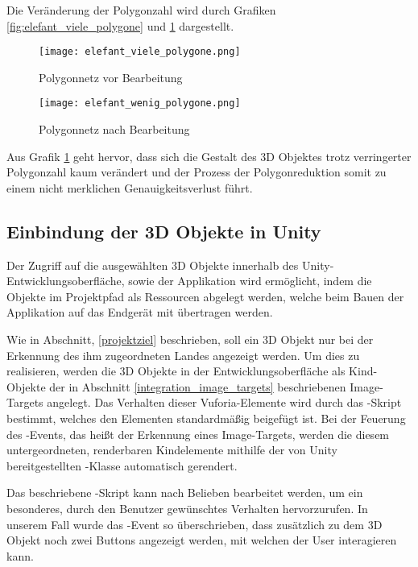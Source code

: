 Die Veränderung der Polygonzahl wird durch Grafiken \ref{fig:elefant_viele_polygone} und \ref{fig:elefant_wenig_polygone} dargestellt.

\begin{figure}[!htb]
  \texttt{[image: elefant\_viele\_polygone.png]}
  \caption{Polygonnetz vor Bearbeitung}\label{fig:elefant_viele_polygone}
\endminipage\hfill
{}
  \texttt{[image: elefant\_wenig\_polygone.png]}
  \caption{Polygonnetz nach Bearbeitung}\label{fig:elefant_wenig_polygone}
\endminipage\hfill
\end{figure}

Aus Grafik \ref{fig:elefant_wenig_polygone} geht hervor, dass sich die Gestalt des 3D Objektes trotz verringerter Polygonzahl kaum verändert und der Prozess der Polygonreduktion somit zu einem nicht merklichen Genauigkeitsverlust führt.
\subsection{Einbindung der 3D Objekte in Unity}\label{einbindung_3D_objekte}
Der Zugriff auf die ausgewählten 3D Objekte innerhalb des Unity-Entwicklungsoberfläche, sowie der Applikation wird ermöglicht, indem die Objekte im Projektpfad als Ressourcen abgelegt werden, welche beim Bauen der Applikation auf das Endgerät mit übertragen werden. 

Wie in Abschnitt, \ref{projektziel} beschrieben, soll ein 3D Objekt nur bei der Erkennung des ihm zugeordneten Landes angezeigt werden.
Um dies zu realisieren, werden die 3D Objekte in der Entwicklungsoberfläche als Kind-Objekte der in Abschnitt \ref{integration_image_targets} beschriebenen Image-Targets angelegt.
Das Verhalten dieser Vuforia-Elemente wird durch das -Skript bestimmt, welches den Elementen standardmäßig beigefügt ist. 
Bei der Feuerung des -Events, das heißt der Erkennung eines Image-Targets, werden die diesem untergeordneten, renderbaren Kindelemente mithilfe der von Unity bereitgestellten -Klasse automatisch gerendert.

Das beschriebene -Skript kann nach Belieben bearbeitet werden, um ein besonderes, durch den Benutzer gewünschtes Verhalten hervorzurufen.
In unserem Fall wurde das -Event so überschrieben, dass zusätzlich zu dem 3D Objekt noch zwei Buttons angezeigt werden, mit welchen der User interagieren kann.

